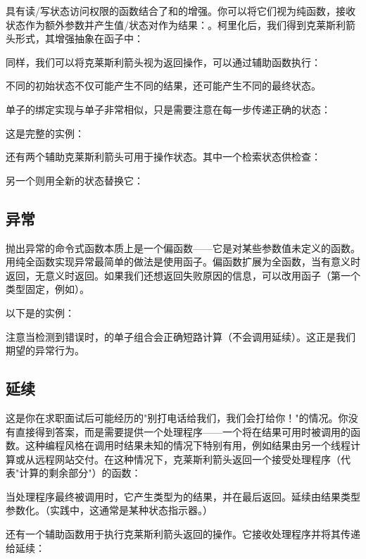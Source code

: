 具有读/写状态访问权限的函数结合了和的增强。你可以将它们视为纯函数，接收状态作为额外参数并产生值/状态对作为结果：。柯里化后，我们得到克莱斯利箭头形式，其增强抽象在函子中：

同样，我们可以将克莱斯利箭头视为返回操作，可以通过辅助函数执行：

不同的初始状态不仅可能产生不同的结果，还可能产生不同的最终状态。

单子的绑定实现与单子非常相似，只是需要注意在每一步传递正确的状态：

这是完整的实例：

还有两个辅助克莱斯利箭头可用于操作状态。其中一个检索状态供检查：

另一个则用全新的状态替换它：


\subsection{异常}

抛出异常的命令式函数本质上是一个偏函数——它是对某些参数值未定义的函数。用纯全函数实现异常最简单的做法是使用函子。偏函数扩展为全函数，当有意义时返回，无意义时返回。如果我们还想返回失败原因的信息，可以改用函子（第一个类型固定，例如）。

以下是的实例：

注意当检测到错误时，的单子组合会正确短路计算（不会调用延续）。这正是我们期望的异常行为。

\subsection{延续}

这是你在求职面试后可能经历的"别打电话给我们，我们会打给你！"的情况。你没有直接得到答案，而是需要提供一个处理程序——一个将在结果可用时被调用的函数。这种编程风格在调用时结果未知的情况下特别有用，例如结果由另一个线程计算或从远程网站交付。在这种情况下，克莱斯利箭头返回一个接受处理程序（代表"计算的剩余部分"）的函数：

当处理程序最终被调用时，它产生类型为的结果，并在最后返回。延续由结果类型参数化。（实践中，这通常是某种状态指示器。）

还有一个辅助函数用于执行克莱斯利箭头返回的操作。它接收处理程序并将其传递给延续：

